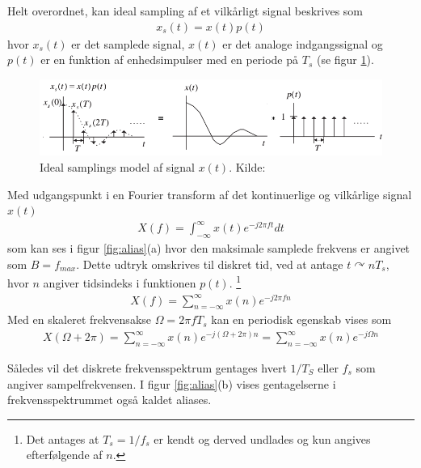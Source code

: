Helt overordnet, kan ideal sampling af et vilkårligt signal beskrives som 
\begin{align}
x_s(t) = x(t)p(t)
\end{align}
hvor $x_s(t)$ er det samplede signal, $x(t)$ er det analoge indgangssignal og $p(t)$ er en funktion af enhedsimpulser med en periode på $T_s$ (se figur \ref{fig:sampling_signal}).
\begin{figure}[h!]
	\centering
	\includegraphics[width=.9\textwidth]{billeder/sampling.png}
	\caption{Ideal samplings model af signal $x(t)$. Kilde:\protect\cite[Figure 2.5 s.18 ]{Tan2013}}
	\label{fig:sampling_signal}
\end{figure}
Med udgangspunkt i en Fourier transform af det kontinuerlige og vilkårlige signal $x(t)$ 
\begin{align}
X(f) = \int_{-\infty}^{\infty}x(t)e^{-j2\pi f t}dt
\end{align}
som kan ses i figur \ref{fig:alias}(a) hvor den maksimale samplede frekvens er angivet som $B=f_{max}$.
Dette udtryk omskrives til diskret tid, ved at antage $t\curvearrowright nT_s$, hvor $n$ angiver tidsindeks i funktionen $p(t)$.
\footnote{Det antages at $T_s = 1/f_s$ er kendt og derved undlades og kun angives efterfølgende af $n$.}
\begin{align}
	X(f) = \sum_{n=-\infty}^{\infty}x(n)e^{-j2\pi f n}
\end{align}
Med en skaleret frekvensakse $\Omega = 2\pi f T_s$ kan en periodisk egenskab vises som
\begin{align}
	X(\Omega + 2\pi) = \sum_{n=-\infty}^{\infty}x(n)e^{-j(\Omega + 2\pi) n} = \sum_{n=-\infty}^{\infty}x(n)e^{-j\Omega n}
\end{align}

Således vil det diskrete frekvensspektrum gentages hvert $1/T_S$ eller $f_s$ som angiver sampelfrekvensen.
I figur \ref{fig:alias}(b) vises gentagelserne i frekvensspektrummet også kaldet aliases.

